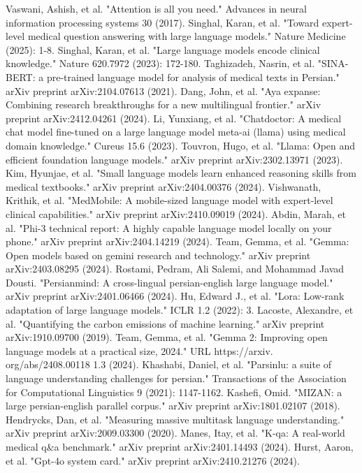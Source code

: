 \documentclass[conference]{IEEEtran}
\begin{document}
\begin{thebibliography}{00}
 Vaswani, Ashish, et al. "Attention is all you need." Advances in neural information processing systems 30 (2017).
 Singhal, Karan, et al. "Toward expert-level medical question answering with large language models." Nature Medicine (2025): 1-8.
Singhal, Karan, et al. "Large language models encode clinical knowledge." Nature 620.7972 (2023): 172-180.
 Taghizadeh, Nasrin, et al. "SINA-BERT: a pre-trained language model for analysis of medical texts in Persian." arXiv preprint arXiv:2104.07613 (2021).
 Dang, John, et al. "Aya expanse: Combining research breakthroughs for a new multilingual frontier." arXiv preprint arXiv:2412.04261 (2024).
 Li, Yunxiang, et al. "Chatdoctor: A medical chat model fine-tuned on a large language model meta-ai (llama) using medical domain knowledge." Cureus 15.6 (2023).
 Touvron, Hugo, et al. "Llama: Open and efficient foundation language models." arXiv preprint arXiv:2302.13971 (2023).
 Kim, Hyunjae, et al. "Small language models learn enhanced reasoning skills from medical textbooks." arXiv preprint arXiv:2404.00376 (2024).
 Vishwanath, Krithik, et al. "MedMobile: A mobile-sized language model with expert-level clinical capabilities." arXiv preprint arXiv:2410.09019 (2024).
 Abdin, Marah, et al. "Phi-3 technical report: A highly capable language model locally on your phone." arXiv preprint arXiv:2404.14219 (2024).
 Team, Gemma, et al. "Gemma: Open models based on gemini research and technology." arXiv preprint arXiv:2403.08295 (2024).
 Rostami, Pedram, Ali Salemi, and Mohammad Javad Dousti. "Persianmind: A cross-lingual persian-english large language model." arXiv preprint arXiv:2401.06466 (2024).
 Hu, Edward J., et al. "Lora: Low-rank adaptation of large language models." ICLR 1.2 (2022): 3.
 Lacoste, Alexandre, et al. "Quantifying the carbon emissions of machine learning." arXiv preprint arXiv:1910.09700 (2019).
 Team, Gemma, et al. "Gemma 2: Improving open language models at a practical size, 2024." URL https://arxiv. org/abs/2408.00118 1.3 (2024).
 Khashabi, Daniel, et al. "Parsinlu: a suite of language understanding challenges for persian." Transactions of the Association for Computational Linguistics 9 (2021): 1147-1162.
 Kashefi, Omid. "MIZAN: a large persian-english parallel corpus." arXiv preprint arXiv:1801.02107 (2018).
 Hendrycks, Dan, et al. "Measuring massive multitask language understanding." arXiv preprint arXiv:2009.03300 (2020).
 Manes, Itay, et al. "K-qa: A real-world medical q\&a benchmark." arXiv preprint arXiv:2401.14493 (2024).
 Hurst, Aaron, et al. "Gpt-4o system card." arXiv preprint arXiv:2410.21276 (2024).
\end{thebibliography}
\end{document}
